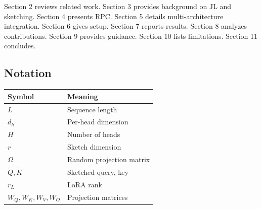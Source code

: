 Section 2 reviews related work. Section 3 provides background on JL and 
sketching. Section 4 presents RPC. Section 5 details multi-architecture 
integration. Section 6 gives setup. Section 7 reports results. Section 8 
analyzes contributions. Section 9 provides guidance. Section 10 lists 
limitations. Section 11 concludes.



\subsection{Notation}

\begin{table}[H]
\centering
\small
\begin{tabular}{ll}
\toprule
\textbf{Symbol} & \textbf{Meaning} \\
\midrule
$L$ & Sequence length \\
$d_h$ & Per-head dimension \\
$H$ & Number of heads \\
$r$ & Sketch dimension \\
$\Omega$ & Random projection matrix \\
$\tilde{Q}, \tilde{K}$ & Sketched query, key \\
$r_L$ & LoRA rank \\
$W_Q, W_K, W_V, W_O$ & Projection matrices \\
\bottomrule
\end{tabular}
\end{table}

